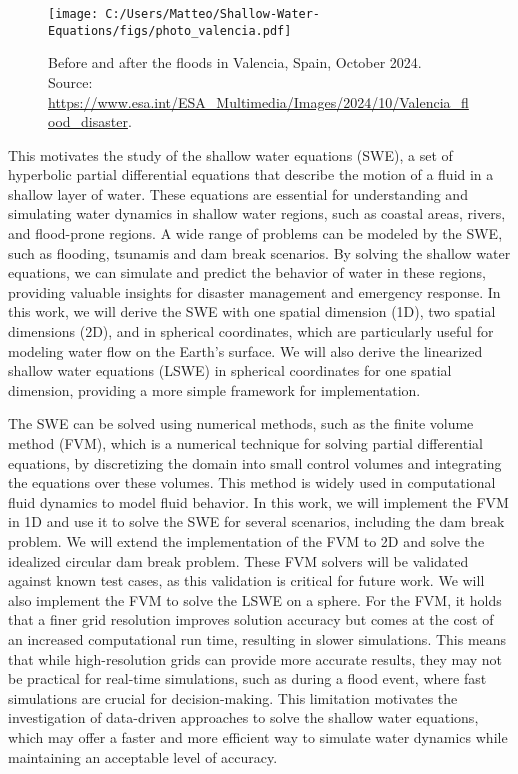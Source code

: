 \begin{figure}
    \centering
    \texttt{[image: C:/Users/Matteo/Shallow-Water-Equations/figs/photo\_valencia.pdf]}
    \caption{Before and after the floods in Valencia, Spain, October 2024.\\
            Source: \url{https://www.esa.int/ESA_Multimedia/Images/2024/10/Valencia_flood_disaster}.}\label{fig:valencia_flood}
\end{figure}
This motivates the study of the shallow water equations (SWE), a set of hyperbolic partial differential equations that describe the motion of a fluid in a shallow layer of water.
These equations are essential for understanding and simulating water dynamics in shallow water regions, such as coastal areas, rivers, and flood-prone regions.
A wide range of problems can be modeled by the SWE, such as flooding, tsunamis and dam break scenarios.
By solving the shallow water equations, we can simulate and predict the behavior of water in these regions, providing valuable insights for disaster management and emergency response.
In this work, we will derive the SWE with one spatial dimension (1D), two spatial dimensions (2D), and in spherical coordinates, which are particularly useful for modeling water flow on the Earth's surface.
We will also derive the linearized shallow water equations (LSWE) in spherical coordinates for one spatial dimension, providing a more simple framework for implementation.

The SWE can be solved using numerical methods, such as the finite volume method (FVM), which is a numerical technique for solving partial differential equations, by discretizing the domain into small control volumes and integrating the equations over these volumes.
This method is widely used in computational fluid dynamics to model fluid behavior.
In this work, we will implement the FVM in 1D and use it to solve the SWE for several scenarios, including the dam break problem.
We will extend the implementation of the FVM to 2D and solve the idealized circular dam break problem.
These FVM solvers will be validated against known test cases, as this validation is critical for future work.
We will also implement the FVM to solve the LSWE on a sphere.
For the FVM, it holds that a finer grid resolution improves solution accuracy but comes at the cost of an increased computational run time, resulting in slower simulations.
This means that while high-resolution grids can provide more accurate results, they may not be practical for real-time simulations, such as during a flood event, where fast simulations are crucial for decision-making.
This limitation motivates the investigation of data-driven approaches to solve the shallow water equations, which may offer a faster and more efficient way to simulate water dynamics while maintaining an acceptable level of accuracy.

